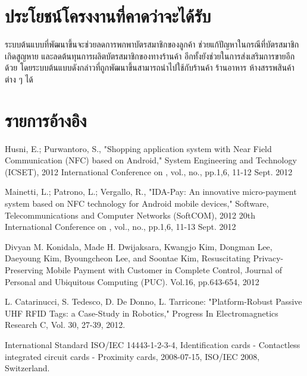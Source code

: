 \documentclass[a4paper]{article}
\begin{document}
\section{ประโยชน์โครงงานที่คาดว่าจะได้รับ}
ระบบต้นแบบที่พัฒนาขึ้นจะช่วยลดการพกพาบัตรสมาชิกของลูกค้า ช่วยแก้ปัญหาในกรณีที่บัตรสมาชิกเกิดสูญหาย และลดต้นทุนการผลิตบัตรสมาชิกของทางร้านค้า อีกทั้งยังช่วยในการส่งเสริมการขายอีกด้วย โดยระบบต้นแบบดังกล่าวที่ถูกพัฒนาขึ้นสามารถนำไปใช้กับร้านค้า ร้านอาหาร ห้างสรรพสินค้าต่าง ๆ ได้

\section{รายการอ้างอิง}
\begin{enumerate}[label={[\arabic*]}]
  	\item \label{itm:shopping} Husni, E.; Purwantoro, S., "Shopping application system with Near Field Communication (NFC) based on Android," System Engineering and Technology (ICSET), 2012 International Conference on , vol., no., pp.1,6, 11-12 Sept. 2012
  	\item \label{itm:IDA-Pay} Mainetti, L.; Patrono, L.; Vergallo, R., "IDA-Pay: An innovative micro-payment system based on NFC technology for Android mobile devices," Software, Telecommunications and Computer Networks (SoftCOM), 2012 20th International Conference on , vol., no., pp.1,6, 11-13 Sept. 2012
	\item \label{itm:rpp-mobile} Divyan M. Konidala, Made H. Dwijaksara, Kwangjo Kim, Dongman Lee, Daeyoung Kim, Byoungcheon Lee, and Soontae Kim, Resuscitating Privacy-Preserving Mobile Payment with Customer in Complete Control, Journal of Personal and Ubiquitous Computing (PUC). Vol.16, pp.643-654, 2012
	\item \label{itm:prp-rfid} L. Catarinucci, S. Tedesco, D. De Donno, L. Tarricone: "Platform-Robust Passive UHF RFID Tags: a Case-Study in Robotics," Progress In Electromagnetics Research C, Vol. 30, 27-39, 2012.
	\item \label{itm:cicc} International Standard ISO/IEC 14443-1-2-3-4, Identification cards - Contactless integrated circuit cards - Proximity cards, 2008-07-15, ISO/IEC 2008, Switzerland.
\end{enumerate}
\end{document}
